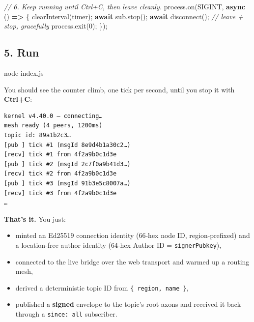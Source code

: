 \documentclass[
  nobib]{tufte-handout}
\newenvironment{Shaded}{}{}
\newcommand{\BuiltInTok}[1]{\textcolor[rgb]{0.00,0.50,0.00}{#1}}
\newcommand{\CommentTok}[1]{\textcolor[rgb]{0.38,0.63,0.69}{\textit{#1}}}
\newcommand{\ControlFlowTok}[1]{\textcolor[rgb]{0.00,0.44,0.13}{\textbf{#1}}}
\newcommand{\DecValTok}[1]{\textcolor[rgb]{0.25,0.63,0.44}{#1}}
\newcommand{\ExtensionTok}[1]{#1}
\newcommand{\FunctionTok}[1]{\textcolor[rgb]{0.02,0.16,0.49}{#1}}
\newcommand{\KeywordTok}[1]{\textcolor[rgb]{0.00,0.44,0.13}{\textbf{#1}}}
\newcommand{\NormalTok}[1]{#1}
\newcommand{\OperatorTok}[1]{\textcolor[rgb]{0.40,0.40,0.40}{#1}}
\newcommand{\PreprocessorTok}[1]{\textcolor[rgb]{0.74,0.48,0.00}{#1}}
\newcommand{\StringTok}[1]{\textcolor[rgb]{0.25,0.44,0.63}{#1}}
\providecommand{\tightlist}{%
  \setlength{\itemsep}{0pt}\setlength{\parskip}{0pt}}
\begin{document}
\begin{Shaded}
\begin{Highlighting}[]
\CommentTok{// 6. Keep running until Ctrl+C, then leave cleanly.}
\BuiltInTok{process}\OperatorTok{.}\FunctionTok{on}\NormalTok{(}\StringTok{\textquotesingle{}SIGINT\textquotesingle{}}\OperatorTok{,} \KeywordTok{async}\NormalTok{ () }\KeywordTok{=\textgreater{}}\NormalTok{ \{}
  \PreprocessorTok{clearInterval}\NormalTok{(timer)}\OperatorTok{;}
  \ControlFlowTok{await}\NormalTok{ sub}\OperatorTok{.}\FunctionTok{stop}\NormalTok{()}\OperatorTok{;}
  \ControlFlowTok{await} \FunctionTok{disconnect}\NormalTok{()}\OperatorTok{;}          \CommentTok{// leave + stop, gracefully}
  \BuiltInTok{process}\OperatorTok{.}\FunctionTok{exit}\NormalTok{(}\DecValTok{0}\NormalTok{)}\OperatorTok{;}
\NormalTok{\})}\OperatorTok{;}
\end{Highlighting}
\end{Shaded}

\subsection{5. Run}\label{run}

\begin{Shaded}
\begin{Highlighting}[]
\ExtensionTok{node}\NormalTok{ index.js}
\end{Highlighting}
\end{Shaded}

You should see the counter climb, one tick per second, until you stop it
with \textbf{Ctrl+C}:

\begin{verbatim}
kernel v4.40.0 — connecting…
mesh ready (4 peers, 1200ms)
topic id: 89a1b2c3…
[pub ] tick #1 (msgId 8e9d4b1a30c2…)
[recv] tick #1 from 4f2a9b0c1d3e
[pub ] tick #2 (msgId 2c7f0a9b41d3…)
[recv] tick #2 from 4f2a9b0c1d3e
[pub ] tick #3 (msgId 91b3e5c8007a…)
[recv] tick #3 from 4f2a9b0c1d3e
…
\end{verbatim}

\textbf{That's it.} You just:

\begin{itemize}
\tightlist
\item
  minted an Ed25519 connection identity (66-hex node ID,
  region-prefixed) and a location-free author identity (64-hex Author ID
  = \texttt{signerPubkey}),
\item
  connected to the live bridge over the web transport and warmed up a
  routing mesh,
\item
  derived a deterministic topic ID from \texttt{\{\ region,\ name\ \}},
\item
  published a \textbf{signed} envelope to the topic's root axons and
  received it back through a
  \texttt{since:\ \textquotesingle{}all\textquotesingle{}} subscriber.
\end{itemize}
\end{document}
